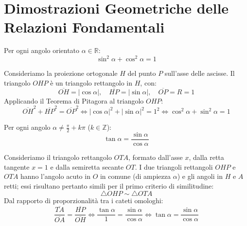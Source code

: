 \documentclass[11pt,a4paper,oneside]{report}
\begin{document}
\section{Dimostrazioni Geometriche delle Relazioni Fondamentali}

\begin{teorema}
Per ogni angolo orientato $\alpha \in \mathbb{R}$:
\begin{equation}
\sin^2\alpha + \cos^2\alpha = 1
\end{equation}
\end{teorema}
\begin{dimostrazione}
Consideriamo la proiezione ortogonale $H$ del punto $P$ sull'asse delle ascisse. Il triangolo $OHP$ \`e un triangolo rettangolo in $H$, con:
\begin{equation}
\overline{OH} = |\cos\alpha|, \quad \overline{HP} = |\sin\alpha|, \quad \overline{OP} = R = 1
\end{equation}
Applicando il Teorema di Pitagora al triangolo $OHP$:
\begin{equation}
\overline{OH}^2 + \overline{HP}^2 = \overline{OP}^2 \iff |\cos\alpha|^2 + |\sin\alpha|^2 = 1^2 \iff \cos^2\alpha + \sin^2\alpha = 1
\end{equation}
\end{dimostrazione}

\begin{teorema}
Per ogni angolo $\alpha \neq \frac{\pi}{2} + k\pi$ ($k \in \mathbb{Z}$):
\begin{equation}
\tan\alpha = \frac{\sin\alpha}{\cos\alpha}
\end{equation}
\end{teorema}
\begin{dimostrazione}
Consideriamo il triangolo rettangolo $OTA$, formato dall'asse $x$, dalla retta tangente $x = 1$ e dalla semiretta secante $OT$. I due triangoli rettangoli $OHP$ e $OTA$ hanno l'angolo acuto in $O$ in comune (di ampiezza $\alpha$) e gli angoli in $H$ e $A$ retti; essi risultano pertanto simili per il primo criterio di similitudine:
\begin{equation}
\triangle OHP \sim \triangle OTA
\end{equation}
Dal rapporto di proporzionalit\`a tra i cateti omologhi:
\begin{equation}
\frac{\overline{TA}}{\overline{OA}} = \frac{\overline{HP}}{\overline{OH}} \iff \frac{\tan\alpha}{1} = \frac{\sin\alpha}{\cos\alpha} \iff \tan\alpha = \frac{\sin\alpha}{\cos\alpha}
\end{equation}
\end{dimostrazione}
\end{document}
